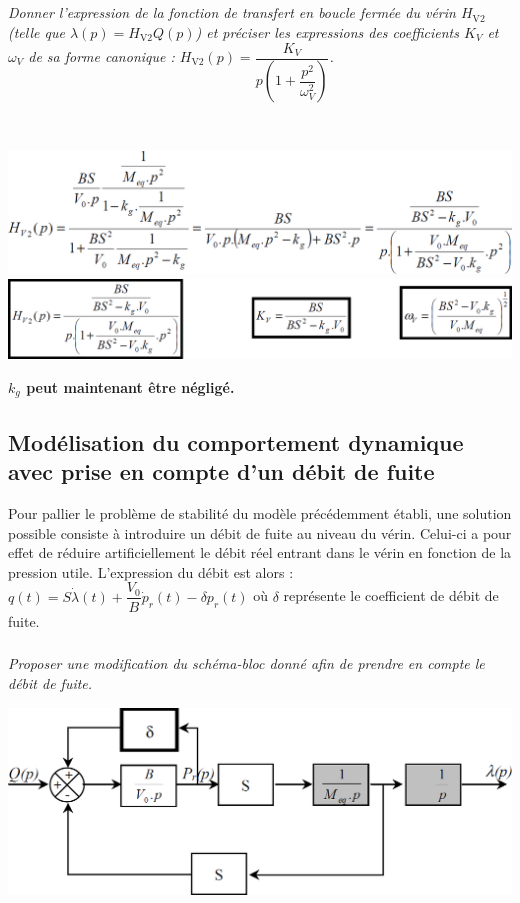 \begin{multicols}{2}
\begin{multicols}{2}
\subparagraph{}\textit{Donner l'expression de la fonction de transfert en boucle fermée du vérin $H_{\text{V2}}$ (telle que $\lambda(p) =  H_{\text{V2}} Q(p)$) et préciser les expressions des coefficients $K_V$ et $\omega_V$ de sa forme canonique : $H_{\text{V2}}(p)=\dfrac{K_V}{p\left( 1+\dfrac{p^2}{\omega_V^2}\right)}$.}
\ifprof
\begin{corrige} ~\\
\begin{center}
\includegraphics[width=.95\linewidth]{images/cor_05}
\includegraphics[width=.95\linewidth]{images/cor_06}
\end{center}
\end{corrige}
\else
\fi

\textbf{$k_g$ peut maintenant être négligé.}

\subsection*{Modélisation du comportement dynamique avec prise en compte d'un débit de fuite}
Pour pallier le problème de stabilité du modèle précédemment établi, une solution possible consiste à introduire un débit de fuite au niveau du vérin. Celui-ci a pour effet de réduire artificiellement le débit réel entrant dans le vérin en fonction de la pression utile. L'expression du débit est alors : 
$q(t)=S\dot{\lambda}(t)+\dfrac{V_0}{B} \dot{p}_r(t)-\delta p_r(t)$ où $\delta$ représente le coefficient de débit de fuite.


\subparagraph{}\textit{Proposer une modification du schéma-bloc donné afin de prendre en compte le débit de fuite.}
\ifprof
\begin{corrige}
\begin{center}
\includegraphics[width=.95\linewidth]{images/cor_07}
\end{center}
\end{corrige}
\else
\fi



\end{multicols}
\end{multicols}
